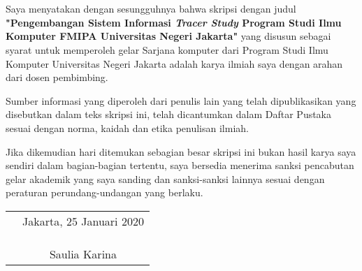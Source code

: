 \chapter*{}

Saya menyatakan dengan sesungguhnya bahwa skripsi dengan judul \textbf{"Pengembangan Sistem Informasi \textit{Tracer Study} Program Studi Ilmu Komputer FMIPA Universitas Negeri Jakarta"} yang disusun sebagai syarat untuk memperoleh gelar Sarjana komputer dari Program Studi Ilmu Komputer Universitas Negeri Jakarta adalah karya ilmiah saya dengan arahan dari dosen pembimbing.

Sumber informasi yang diperoleh dari penulis lain yang
telah dipublikasikan yang disebutkan dalam teks skripsi ini, telah dicantumkan dalam Daftar Pustaka sesuai dengan norma, kaidah dan etika penulisan ilmiah.

Jika dikemudian hari ditemukan sebagian besar skripsi ini bukan hasil karya saya sendiri dalam bagian-bagian tertentu, saya bersedia menerima sanksi pencabutan gelar akademik yang saya sanding dan sanksi-sanksi lainnya sesuai dengan peraturan perundang-undangan yang berlaku.

\vspace{.5cm}

\begin{tabular}{p{7.5cm}c}
	&Jakarta, 25 Januari 2020\\
	&\\
	&\\
	&\\
	&Saulia Karina
\end{tabular}